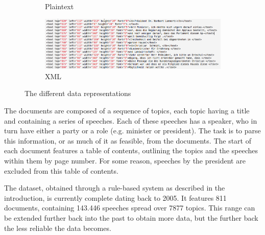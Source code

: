 \begin{figure}[htbp]
\begin{subfigure}[b]{0.59\textwidth}
    \caption{Plaintext}
    \vspace{2ex}
    \includegraphics[width=\textwidth]{xml.png}
    \caption{XML}
  \end{subfigure}
  \caption{The different data representations}
  \label{fig:example}
\end{figure}

The documents are composed of a sequence of topics, each topic having a title
and containing a series of speeches. Each of these speeches has a speaker, who
in turn have either a party or a role (e.g. minister or president). The task is
to parse this information, or as much of it as feasible, from the documents. The
start of each document features a table of contents, outlining the topics and
the speeches within them by page number. For some reason, speeches by the
president are excluded from this table of contents.

The dataset, obtained through a rule-based system as described in the
introduction, is currently complete dating back to 2005. It features 811
documents, containing 143.446 speeches spread over 7877 topics. This range can
be extended further back into the past to obtain more data, but the further back
the less reliable the data becomes.
